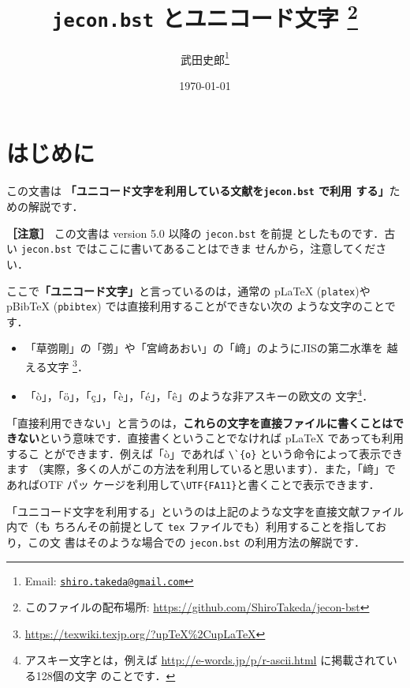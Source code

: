 \documentclass[article]{jlreq}
\title{\textbf{\texttt{jecon.bst} とユニコード文字}
\thanks{このファイルの配布場所: \url{https://github.com/ShiroTakeda/jecon-bst}}
}
\author{武田史郎\thanks{Email:
\texttt{\href{mailto:shiro.takeda@gmail.com}{shiro.takeda@gmail.com}}}}
\date{\today}
\begin{document}
\maketitle

\tableofcontents


\vspace*{1em}

\section{はじめに}

この文書は \textbf{「ユニコード文字を利用している文献を\texttt{jecon.bst} で利用
する」}ための解説です．
\\
\vspace*{1em}

\noindent \textbf{［注意］} この文書は version 5.0 以降の \texttt{jecon.bst} を前提
としたものです．古い \texttt{jecon.bst} ではここに書いてあることはできま
せんから，注意してください．

\vspace*{1em}

ここで\textbf{「ユニコード文字」}と言っているのは，通常の pLaTeX
(\texttt{platex})やpBibTeX (\texttt{pbibtex}) では直接利用することができない次の
ような文字のことです．
\begin{itemize}
 \item 「草彅剛」の「彅」や「宮﨑あおい」の「﨑」のようにJISの第二水準を
       越える文字
       \footnote{\url{https://texwiki.texjp.org/?upTeX\%2CupLaTeX}}．
 \item 「ò」，「ö」，「ç」，「è」，「é」，「ê」のような非アスキーの欧文の
       文字\footnote{アスキー文字とは，例えば
       \url{http://e-words.jp/p/r-ascii.html} に掲載されている128個の文字
       のことです．}．
\end{itemize}

「直接利用できない」と言うのは，\textbf{これらの文字を直接ファイルに書くことはで
きない}という意味です．直接書くということでなければ pLaTeX であっても利用するこ
とができます．例えば「ò」であれば \verb|\`{o}| という命令によって表示できます
（実際，多くの人がこの方法を利用していると思います）．また，「﨑」であればOTF パッ
ケージを利用して\verb|\UTF{FA11}|と書くことで表示できます．

「ユニコード文字を利用する」というのは上記のような文字を直接文献ファイル内で（も
ちろんその前提として \texttt{tex} ファイルでも）利用することを指しており，この文
書はそのような場合での \texttt{jecon.bst} の利用方法の解説です．
\end{document}

